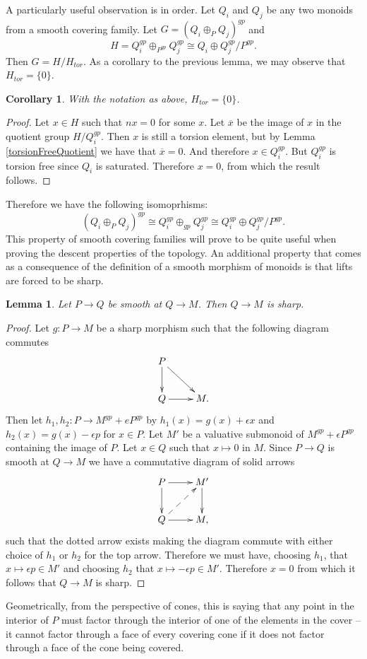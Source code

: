 \documentclass[12pt]{amsart}
\numberwithin{equation}{section}
\theoremstyle{plain}
\newtheorem{lem}[equation]{Lemma}
\newtheorem{cor}[equation]{Corollary}
\theoremstyle{remark}
\begin{document}
A particularly useful observation is in order. Let $Q_i$ and $Q_j$ be any two monoids from a smooth covering family. Let $G = (Q_i\oplus_P Q_j)^{gp}$ and
	$$H = Q_i^{gp}\oplus_{P^{gp}} Q_j^{gp}\cong Q_i\oplus Q_j^{gp}/P^{gp}.$$
Then $G = H/H_{tor}$. As a corollary to the previous lemma, we may observe that $H_{tor} = \{0\}$.
\begin{cor}\label{noTorsion}
	With the notation as above, $H_{tor} = \{0\}$.
\end{cor}
\begin{proof}
	Let $x\in H$ such that $nx = 0$ for some $x$. Let $\overline{x}$ be the image of $x$ in the quotient group $H/Q_i^{gp}$. Then $x$ is still a torsion element, but by Lemma \eqref{torsionFreeQuotient} we have that $\overline{x} = 0$. And therefore $x\in Q_i^{gp}$. But $Q_i^{gp}$ is torsion free since $Q_i$ is saturated. Therefore $x = 0$, from which the result follows.
\end{proof}
Therefore we have the following isomoprhisms:
	$$(Q_i\oplus_P Q_j)^{gp} \cong Q_i^{gp}\oplus_{gp} Q_j^{gp} \cong Q_i^{gp}\oplus Q_j^{gp}/P^{gp}.$$
This property of smooth covering families will prove to be quite useful when proving the descent properties of the topology. An additional property that comes as a consequence of the definition of a smooth morphism of monoids is that lifts are forced to be sharp. \\
\begin{lem}\label{sharpLift}
	Let $P\to Q$ be smooth at $Q\to M$. Then $Q\to M$ is sharp.
\end{lem}	
\begin{proof}
	Let $g:P\to M$ be a sharp morphism such that the following diagram commutes
$$\xymatrix{
	P \ar[dr] \ar[d]& \\
	Q\ar[r] &M.\\}$$
Then let $h_1, h_2:P\to M^{gp} + eP^{gp}$ by $h_1(x) = g(x) + \epsilon x$ and $h_2(x) = g(x) - \epsilon p$ for $x\in P$. Let $M'$ be a valuative submonoid of $M^{gp} + \epsilon P^{gp}$ containing the image of $P$. Let $x\in Q$ such that $x\mapsto 0$ in $M$. Since $P\to Q$ is smooth at $Q\to M$ we have a commutative diagram of solid arrows
$$\xymatrix{
	P\ar[r]\ar[d] & M'\ar[d]\\
	Q\ar[r]\ar@{-->}[ur] & M,}$$
such that the dotted arrow exists making the diagram commute with either choice of $h_1$ or $h_2$ for the top arrow. Therefore we must have, choosing $h_1$, that $x\mapsto \epsilon p\in M'$ and choosing $h_2$ that $x\mapsto -\epsilon p\in M'$. Therefore $x=0$ from which it follows that $Q\to M$ is sharp. 
\end{proof}
Geometrically, from the perspective of cones, this is saying that any point in the interior of $P$ must factor through the interior of one of the elements in the cover -- it cannot factor through a face of every covering cone if it does not factor through a face of the cone being covered.
\end{document}
